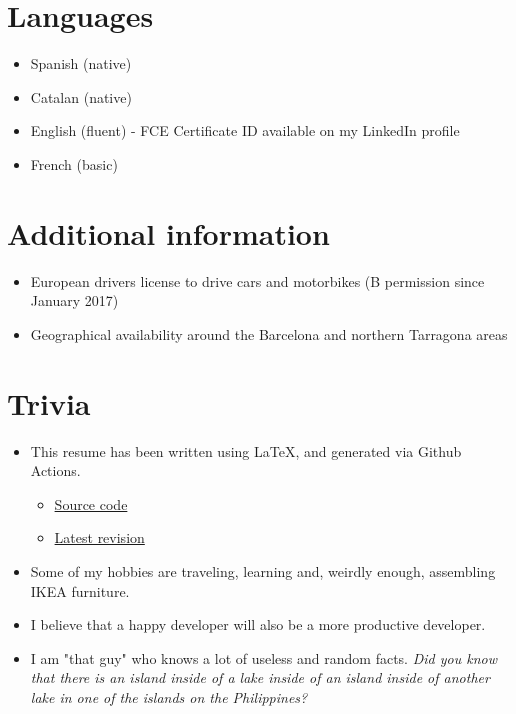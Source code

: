 \documentclass{article}
\newcommand{\nl}{\vspace{3mm}}
\begin{document}
{	\nl

	\section*{Languages}
	\begin{itemize}
		\setlength\itemsep{0em}
		\item Spanish (native)
		\item Catalan (native)
		\item English (fluent) - FCE Certificate ID available on my LinkedIn profile
		\item French (basic)
	\end{itemize}
	
	\section*{Additional information}
	\begin{itemize}
		\setlength\itemsep{0em}
		\item European drivers license to drive cars and motorbikes (B permission since January 2017)
		\item Geographical availability around the Barcelona and northern Tarragona areas
	\end{itemize}
	
	\section*{Trivia}
	\begin{itemize}
		\item This resume has been written using \LaTeX, and generated via Github Actions.
		\begin{itemize}
			\item \textcolor{Green}{\href{https://github.com/Kyngo/Resume}{Source code}}
			\item \textcolor{Green}{\href{https://github.com/Kyngo/Resume/releases/latest}{Latest revision}}
		\end{itemize}
		\item Some of my hobbies are traveling, learning and, weirdly enough, assembling IKEA furniture.
		\item I believe that a happy developer will also be a more productive developer.
		\item I am "that guy" who knows a lot of useless and random facts. \textit{Did you know that there is an island inside of a lake inside of an island inside of another lake in one of the islands on the Philippines?}
	\end{itemize}
	
}
\end{document}
